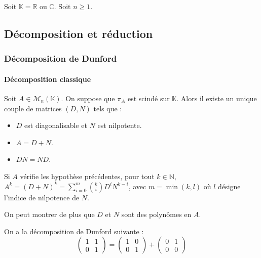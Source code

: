 



	
	Soit $\mathbb{K} = \mathbb{R}$ ou $\mathbb{C}$. Soit $n \geq 1$.

	\subsection{Décomposition et réduction}
	
	\subsubsection{Décomposition de Dunford}
	
	\paragraph{Décomposition classique}
	
	
	\begin{theorem}
		Soit $A \in \mathcal{M}_n(\mathbb{K})$. On suppose que $\pi_A$ est scindé sur $\mathbb{K}$. Alors il existe un unique couple de matrices $(D, N)$ tels que :
		\begin{itemize}
			\item $D$ est diagonalisable et $N$ est nilpotente.
			\item $A = D + N$.
			\item $DN = ND$.
		\end{itemize}
	\end{theorem}
	
	\begin{corollary}
		Si $A$ vérifie les hypothèse précédentes, pour tout $k \in \mathbb{N}$, $A^k = (D + N)^k = \sum_{i=0}^m \binom{k}{i} D^i N^{k-i}$, avec $m = \min(k, l)$ où $l$ désigne l'indice de nilpotence de $N$.
	\end{corollary}
	
	\begin{remark}
		On peut montrer de plus que $D$ et $N$ sont des polynômes en $A$.
	\end{remark}
	
	
	\begin{example}
		On a la décomposition de Dunford suivante :
		\[ \begin{pmatrix} 1 & 1 \\ 0 & 1 \end{pmatrix} = \begin{pmatrix} 1 & 0 \\ 0 & 1 \end{pmatrix} + \begin{pmatrix} 0 & 1 \\ 0 & 0 \end{pmatrix} \]
	\end{example}
	
